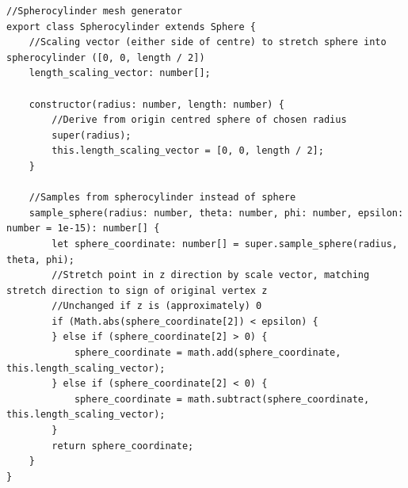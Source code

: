 \begin{adjustbox}{width=\textwidth}
\begin{lstlisting}
//Spherocylinder mesh generator
export class Spherocylinder extends Sphere {
    //Scaling vector (either side of centre) to stretch sphere into spherocylinder ([0, 0, length / 2])
    length_scaling_vector: number[];

    constructor(radius: number, length: number) {
        //Derive from origin centred sphere of chosen radius
        super(radius);
        this.length_scaling_vector = [0, 0, length / 2];
    }

    //Samples from spherocylinder instead of sphere
    sample_sphere(radius: number, theta: number, phi: number, epsilon: number = 1e-15): number[] {
        let sphere_coordinate: number[] = super.sample_sphere(radius, theta, phi);
        //Stretch point in z direction by scale vector, matching stretch direction to sign of original vertex z
        //Unchanged if z is (approximately) 0
        if (Math.abs(sphere_coordinate[2]) < epsilon) {
        } else if (sphere_coordinate[2] > 0) {
            sphere_coordinate = math.add(sphere_coordinate, this.length_scaling_vector);
        } else if (sphere_coordinate[2] < 0) {
            sphere_coordinate = math.subtract(sphere_coordinate, this.length_scaling_vector);
        }
        return sphere_coordinate;
    }
}
\end{lstlisting}
\end{adjustbox}

